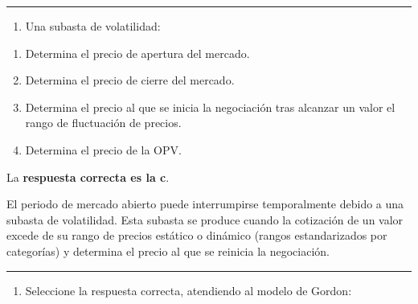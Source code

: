 \documentclass[
  letterpaper,
  DIV=11,
  numbers=noendperiod]{scrreprt}
\providecommand{\tightlist}{%
  \setlength{\itemsep}{0pt}\setlength{\parskip}{0pt}}\usepackage{longtable,booktabs,array}
\begin{document}
\begin{center}\rule{0.5\linewidth}{0.5pt}\end{center}

\begin{enumerate}
\def\labelenumi{\arabic{enumi}.}
\setcounter{enumi}{60}
\tightlist
\item
  Una subasta de volatilidad:
\end{enumerate}

\begin{enumerate}
\def\labelenumi{\alph{enumi}.}
\item
  Determina el precio de apertura del mercado.
\item
  Determina el precio de cierre del mercado.
\item
  Determina el precio al que se inicia la negociación tras alcanzar un
  valor el rango de fluctuación de precios.
\item
  Determina el precio de la OPV.
\end{enumerate}

\begin{tcolorbox}[enhanced jigsaw, left=2mm, opacityback=0, colback=white, breakable, arc=.35mm, bottomrule=.15mm, rightrule=.15mm, toprule=.15mm, leftrule=.75mm, colframe=quarto-callout-tip-color-frame]
\begin{minipage}[t]{5.5mm}
\textcolor{quarto-callout-tip-color}{\faLightbulb}
\end{minipage}%
\begin{minipage}[t]{\textwidth - 5.5mm}

La \textbf{respuesta correcta es la c}.

El periodo de mercado abierto puede interrumpirse temporalmente debido a
una subasta de volatilidad. Esta subasta se produce cuando la cotización
de un valor excede de su rango de precios estático o dinámico (rangos
estandarizados por categorías) y determina el precio al que se reinicia
la negociación.

\end{minipage}%
\end{tcolorbox}

\begin{center}\rule{0.5\linewidth}{0.5pt}\end{center}

\begin{enumerate}
\def\labelenumi{\arabic{enumi}.}
\setcounter{enumi}{61}
\tightlist
\item
  Seleccione la respuesta correcta, atendiendo al modelo de Gordon:
\end{enumerate}
\end{document}
